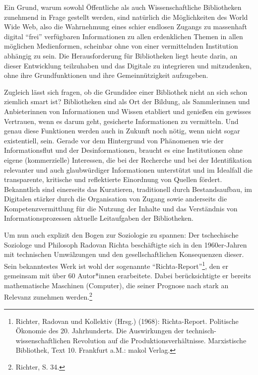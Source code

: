 \documentclass[a4paper,
fontsize=11pt,
oneside,
numbers=noperiodatend,
parskip=half-,
bibliography=totoc,
final
]{scrartcl}
\begin{document}
Ein Grund, warum sowohl Öffentliche als auch Wissenschaftliche
Bibliotheken zunehmend in Frage gestellt werden, sind natürlich die
Möglichkeiten des World Wide Web, also die Wahrnehmung eines schier
endlosen Zugangs zu massenhaft digital \enquote{frei} verfügbaren
Informationen zu allen erdenklichen Themen in allen möglichen
Medienformen, scheinbar ohne von einer vermittelnden Institution
abhängig zu sein. Die Herausforderung für Bibliotheken liegt heute
darin, an dieser Entwicklung teilzuhaben und das Digitale zu integrieren
und mitzudenken, ohne ihre Grundfunktionen und ihre Gemeinnützigkeit
aufzugeben.

Zugleich lässt sich fragen, ob die Grundidee einer Bibliothek nicht an
sich schon ziemlich smart ist? Bibliotheken sind als Ort der Bildung,
als Sammlerinnen und Anbieterinnen von Informationen und Wissen
etabliert und genießen ein gewisses Vertrauen, wenn es darum geht,
gesicherte Informationen zu vermitteln. Und genau diese Funktionen
werden auch in Zukunft noch nötig, wenn nicht sogar existentiell, sein.
Gerade vor dem Hintergrund von Phänomenen wie der Informationsflut und
der Desinformationen, braucht es eine Institutionen ohne eigene
(kommerzielle) Interessen, die bei der Recherche und bei der
Identifikation relevanter und auch glaubwürdiger Informationen
unterstützt und im Idealfall die transparente, kritische und
reflektierte Einordnung von Quellen fördert. Bekanntlich sind einerseits
das Kuratieren, traditionell durch Bestandsaufbau, im Digitalen stärker
durch die Organisation von Zugang sowie anderseits die
Kompetenzvermittlung für die Nutzung der Inhalte und das Verständnis von
Informationsprozessen aktuelle Leitaufgaben der Bibliotheken.

Um nun auch explizit den Bogen zur Soziologie zu spannen: Der
tschechische Soziologe und Philosoph Radovan Richta beschäftigte sich in
den 1960er-Jahren mit technischen Umwälzungen und den gesellschaftlichen
Konsequenzen dieser. Sein bekanntestes Werk ist wohl der sogenannte
\enquote{Richta-Report}\footnote{Richter, Radovan und Kollektiv (Hrsg.)
  (1968): Richta-Report. Politische Ökonomie des 20. Jahrhunderts. Die
  Auswirkungen der technisch-wissenschaftlichen Revolution auf die
  Produktionsverhältnisse. Marxistische Bibliothek, Text 10. Frankfurt
  a.M.: makol Verlag.}, den er gemeinsam mit über 60 Autor*innen
erarbeitete. Dabei berücksichtigte er bereits mathematische Maschinen
(Computer), die seiner Prognose nach stark an Relevanz zunehmen
werden.\footnote{Richter, S. 34.}
\end{document}
